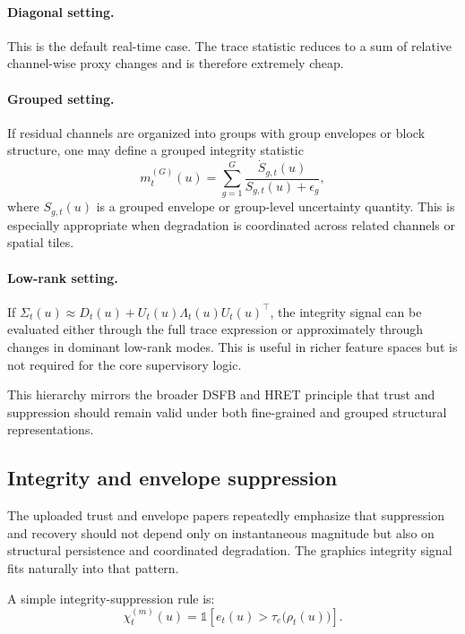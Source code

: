 \documentclass[11pt]{article}
\theoremstyle{definition}
\theoremstyle{plain}
\begin{document}
\paragraph{Diagonal setting.}
This is the default real-time case. The trace statistic reduces to a sum of relative channel-wise proxy changes and is therefore extremely cheap.

\paragraph{Grouped setting.}
If residual channels are organized into groups with group envelopes or block structure, one may define a grouped integrity statistic
\begin{equation}
m^{(G)}_t(u)=\sum_{g=1}^{G}
\frac{\dot S_{g,t}(u)}{S_{g,t}(u)+\epsilon_g},
\end{equation}
where $S_{g,t}(u)$ is a grouped envelope or group-level uncertainty quantity. This is especially appropriate when degradation is coordinated across related channels or spatial tiles.

\paragraph{Low-rank setting.}
If $\Sigma_t(u)\approx D_t(u)+U_t(u)\Lambda_t(u)U_t(u)^\top$, the integrity signal can be evaluated either through the full trace expression or approximately through changes in dominant low-rank modes. This is useful in richer feature spaces but is not required for the core supervisory logic.

This hierarchy mirrors the broader DSFB and HRET principle that trust and suppression should remain valid under both fine-grained and grouped structural representations. 


\subsection{Integrity and envelope suppression}

The uploaded trust and envelope papers repeatedly emphasize that suppression and recovery should not depend only on instantaneous magnitude but also on structural persistence and coordinated degradation. The graphics integrity signal fits naturally into that pattern.

A simple integrity-suppression rule is:
\begin{equation}
\chi^{(m)}_t(u)=
\mathbb{1}\!\left[
e_t(u)>\tau_e\bigl(\rho_t(u)\bigr)
\right].
\end{equation}
\end{document}
